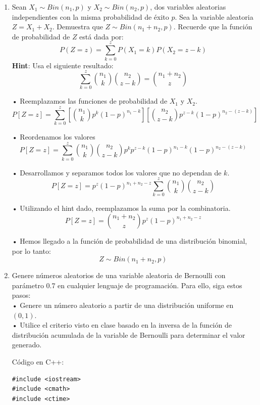 \documentclass[a4paper, 12pt]{article}
\newcommand{\Pspace}{0.5cm}
\newcommand{\Aspace}{0.2cm}
\begin{document}
\begin{enumerate}
            \newpage
        \item Sean $X_{1} \sim Bin(n_{1}, p)$ y $X_{2} \sim Bin(n_{2}, p)$, dos variables aleatorias independientes con la misma probabilidad de éxito $p$.  
            Sea la variable aleatoria $Z = X_{1} + X_{2}$. Demuestra que $Z \sim Bin(n_{1} + n_{2}, p)$.  
            Recuerde que la función de probabilidad de $Z$ está dada por:
            \[
                P(Z = z) = \sum_{k = 0}^{z} P(X_{1} = k) P(X_{2} = z - k)
            \]
            \textbf{Hint}: Usa el siguiente resultado:
            \[
                \sum_{k = 0}^{z} \binom{n_{1}}{k} \binom{n_{2}}{z - k} = \binom{n_{1} + n_{2}}{z}
            \]
            \vspace{\Aspace} \par
            { \color{azul} 
                • Reemplazamos las funciones de probabilidad de $X_{1}$ y $X_{2}$.
                \[ P[Z = z] = \sum_{k = 0}^{z} \left[ \binom{n_{1}}{k} p^{k} (1 - p)^{n_{1} - k} \right] \left[ \binom{n_{2}}{z - k} p^{z - k} (1 - p)^{n_{2} - (z - k)} \right] \]

                • Reordenamos los valores
                \[ P[Z = z] = \sum_{k = 0}^{z} \binom{n_{1}}{k} \binom{n_{2}}{z - k} p^{k} p^{z - k} (1 - p)^{n_{1} - k} (1 - p)^{n_{2} - (z - k)} \]

                • Desarrollamos y separamos todos los valores que no dependan de $k$.
                \[ P[Z = z] = p^{z} (1 - p)^{n_{1} + n_{2} - z} \sum_{k = 0}^{z} \binom{n_{1}}{k} \binom{n_{2}}{z - k} \]

                • Utilizando el hint dado, reemplazamos la suma por la combinatoria.
                \[ P[Z = z] = \binom{n_{1} + n_{2}}{z} p^{z} (1 - p)^{n_{1} + n_{2} - z} \]

                • Hemos llegado a la función de probabilidad de una distribución binomial, por lo tanto:
                \[ Z \sim Bin(n_{1} + n_{2}, p) \]
            }

    
            \newpage
            \vspace{\Pspace}
        \item Genere números aleatorios de una variable aleatoria de Bernoulli con parámetro 0.7 en cualquier lenguaje de programación. Para ello, siga estos pasos:
            \vspace{0.2cm}
            \\ • Genere un número aleatorio a partir de una distribución uniforme en $(0, 1)$.
            \\ • Utilice el criterio visto en clase basado en la inversa de la función de distribución acumulada de la variable de Bernoulli para determinar el valor generado.
            \vspace{\Aspace} \par
{ 
\color{azul} 
\Large Código en C++:
\begin{lstlisting}
#include <iostream>
#include <cmath>
#include <ctime>


\end{lstlisting}}
\end{enumerate}
\end{document}
